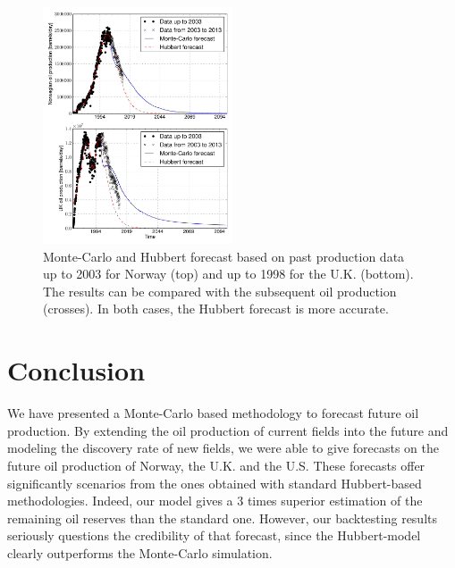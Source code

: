 \documentclass[twoside]{article}
\begin{document}
\begin{multicols}{2}
\begin{figure}[H]
    \includegraphics[width=0.5\textwidth]{no_and_uk_bt.pdf}
    \caption{Monte-Carlo and Hubbert forecast based on past production data up to 2003 for Norway (top) and up to 1998 for the U.K. (bottom).  The results can be compared with the subsequent oil production (crosses). In both cases, the Hubbert forecast is more accurate.}
    \label{bt}
\end{figure}


\section{Conclusion}
We have presented a Monte-Carlo based methodology to forecast future oil production. By extending the oil production of current fields into the future and modeling the discovery rate of new fields, we were able to give forecasts on the future oil production of Norway, the U.K. and the U.S. These forecasts offer significantly scenarios from the ones obtained with standard Hubbert-based methodologies. Indeed, our model gives a 3 times superior estimation of the remaining oil reserves than the standard one. However, our backtesting results seriously questions the credibility of that forecast, since the Hubbert-model clearly outperforms the Monte-Carlo simulation. 


 


\end{multicols}
\end{document}
